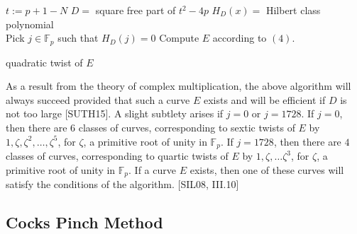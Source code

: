 \documentclass[12pt,twoside]{article}
\begin{document}
\begin{algorithm}[H]
 $t := p+1 - N$\; 
 $D = $ square free part of $t^2-4p$\;
 $H_D(x) = $ Hilbert class polynomial \\
 Pick $j \in \mathbb F_p$ such that $H_D(j) = 0$
 Compute $E$ according to $(4)$.
 
  {
 }
 {\Return quadratic twist of $E$}
 \end{algorithm}
 \bigskip
 

 
 
 
 
 
 
\noindent As a result from the theory of complex multiplication, the above algorithm will always succeed provided that such a curve $E$ exists and will be efficient if $D$ is not too large [SUTH15]. A slight subtlety arises if $j = 0$ or $j = 1728$. If $j = 0$, then there are $6$ classes of curves, corresponding to sextic twists of $E$ by $1, \zeta, \zeta^2, \dots, \zeta^5$, for $\zeta$, a primitive root of unity in $\mathbb F_p$. If $j = 1728$, then there are $4$ classes of curves, corresponding to quartic twists of $E$ by $1, \zeta, \dots \zeta^3$, for $\zeta$, a primitive root of unity in $\mathbb F_p$. If a curve $E$ exists, then one of these curves will satisfy the conditions of the algorithm. [SIL08, III.10]
\subsection{Cocks Pinch Method}
\end{document}
